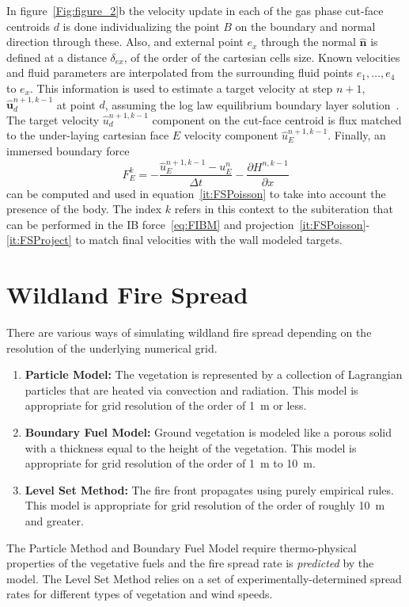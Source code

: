 \documentclass[journal,article,atmosphere,submit,moreauthors,pdftex]{Definitions/mdpi}
\begin{document}
In figure~\ref{Fig:figure_2}b the velocity update in each of the gas phase cut-face centroids $d$ is done individualizing the point $B$ on the boundary and normal direction through these. Also, and external point $e_x$ through the normal $\mathbf{\hat{n}}$ is defined at a distance $\delta_{ex}$, of the order of the cartesian cells size. Known velocities and fluid parameters are interpolated from the surrounding fluid points $e_1,\dots,e_4$ to $e_x$.
This information is used to estimate a target velocity at step $n+1$, $\mathbf{\hat{u}}_d^{n+1,k-1}$ at point $d$, assuming the log law equilibrium boundary layer solution~\cite{mcgratta_2013}. The target velocity $\hat{u}_d^{n+1,k-1}$ component on the cut-face centroid is flux matched to the under-laying cartesian face $E$ velocity component $\hat{u}_E^{n+1,k-1}$. Finally, an immersed boundary force
%
\begin{equation}
F_E^k=-\frac{\hat{u}_E^{n+1,k-1}-u_E^{n}}{\Delta t} - \frac{\partial H^{n,k-1}}{\partial x}
\label{eq:FIBM}
\end{equation}
%
can be computed and used in equation~\eqref{it:FSPoisson} to take into account the presence of the body. The index $k$ refers in this context to the subiteration that can be performed in the IB force~\eqref{eq:FIBM} and projection~\eqref{it:FSPoisson}-\eqref{it:FSProject} to match final velocities with the wall modeled targets.


\section{Wildland Fire Spread} \label{sec:firespread}

There are various ways of simulating wildland fire spread depending on the resolution of the underlying numerical grid. 
\begin{enumerate}
\item {\bf Particle Model:} The vegetation is represented by a collection of Lagrangian particles that are heated via convection and radiation. This model is appropriate for grid resolution of the order of 1~m or less.
\item {\bf Boundary Fuel Model:} Ground vegetation is modeled like a porous solid with a thickness equal to the height of the vegetation. This model is appropriate for grid resolution of the order of 1~m to 10~m.
\item {\bf Level Set Method:} The fire front propagates using purely empirical rules. This model is appropriate for grid resolution of the order of roughly 10~m and greater. 
\end{enumerate}
The Particle Method and Boundary Fuel Model require thermo-physical properties of the vegetative fuels and the fire spread rate is {\em predicted} by the model. The Level Set Method relies on a set of experimentally-determined spread rates for different types of vegetation and wind speeds.
\end{document}
